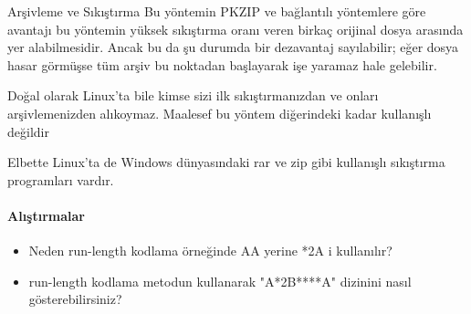 \documentclass[10pt,a5paper]{book}
\begin{document}
\begin{section}{Arşivleme ve Sıkıştırma}
Bu yöntemin PKZIP ve bağlantılı yöntemlere göre avantajı bu yöntemin yüksek sıkıştırma oranı veren birkaç orijinal dosya arasında yer alabilmesidir. Ancak bu da şu durumda bir dezavantaj sayılabilir; eğer dosya hasar görmüşse tüm arşiv bu noktadan başlayarak işe yaramaz hale gelebilir.

Doğal olarak Linux’ta bile kimse sizi ilk sıkıştırmanızdan ve onları arşivlemenizden alıkoymaz. Maalesef bu yöntem diğerindeki kadar kullanışlı değildir

Elbette Linux’ta de Windows dünyasındaki rar ve zip gibi kullanışlı sıkıştırma programları vardır.
\paragraph{Alıştırmalar}{
\begin{itemize}
 \item Neden run-length kodlama örneğinde AA yerine *2A i kullanılır?
 \item run-length kodlama metodun kullanarak "A*2B****A" dizinini
nasıl gösterebilirsiniz?
\end{itemize}}
\end{section}
\end{document}
